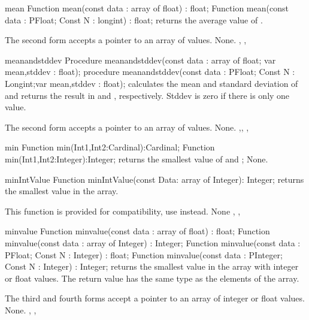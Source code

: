 
\begin{function}{mean}
\Declaration
Function mean(const data : array of float) : float;
Function mean(const data : PFloat; Const N : longint) : float;
\Description
{} returns the average value of .

The second form accepts a pointer to an array of  values.
\Errors
None.
\SeeAlso
{}, , 
\end{function}


\begin{procedure}{meanandstddev}
\Declaration
Procedure meanandstddev(const data : array of float; 
                        var mean,stddev : float);
procedure meanandstddev(const data : PFloat;
  Const N : Longint;var mean,stddev : float);
\Description
{} calculates the mean and standard deviation of 
and returns the result in  and , respectively.
Stddev is zero if there is only one value.

The second form accepts a pointer to an array of  values.
\Errors
None.
\SeeAlso
{},, , 
\end{procedure}



\begin{function}{min}
\Declaration
Function min(Int1,Int2:Cardinal):Cardinal;
Function min(Int1,Int2:Integer):Integer;
\Description
{} returns the smallest value of  and ;
\Errors
None.
\SeeAlso
{}
\end{function}


\begin{function}{minIntValue}
\Declaration
Function minIntValue(const Data: array of Integer): Integer;
\Description
{} returns the smallest value in the  array.

This function is provided for \delphi compatibility, use 
instead.
\Errors
None
\SeeAlso
{}, , 
\end{function}



\begin{function}{minvalue}
\Declaration
Function minvalue(const data : array of float) : float;
Function minvalue(const data : array of Integer) : Integer;
Function minvalue(const data : PFloat; Const N : Integer) : float;
Function minvalue(const data : PInteger; Const N : Integer) : Integer;
\Description
{} returns the smallest value in the  
array with integer or float values. The return value has 
the same type as the elements of the array.

The third and fourth forms accept a pointer to an array of  
integer or float values.
\Errors
None.
\SeeAlso
{}, , 
\end{function}

